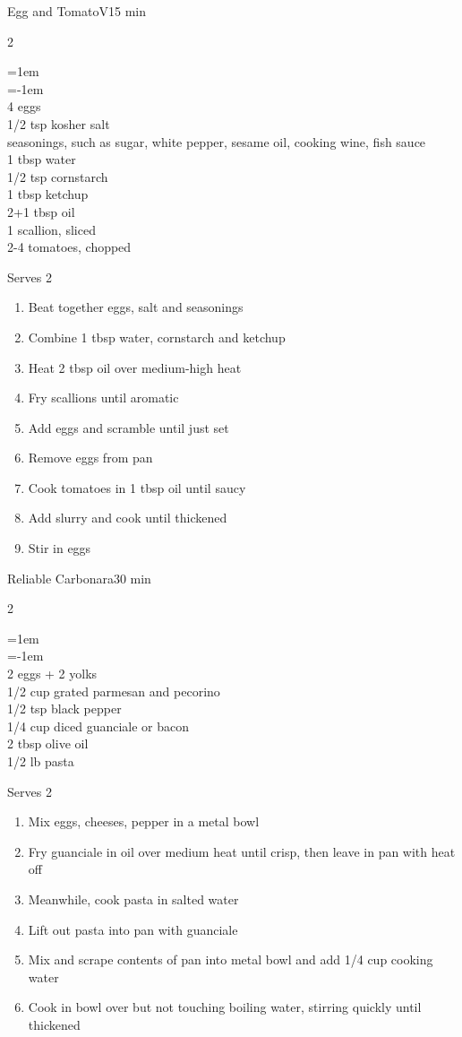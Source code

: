 \documentclass{article}
\newenvironment{recipe}[3][]
    {\begin{cardbase}[#1]{#2}{#3}
    \columnratio{0.333}
    \begin{paracol}{2}}
    {\end{paracol}\end{cardbase}}
\newenvironment{denserecipe}[3][]
    {\small
    \begin{recipe}[#1]{#2}{#3}}
    {\end{recipe}}
\newcommand{\nextcolumn}{\switchcolumn}
\newenvironment{ingredients}
    {
    \begin{obeylines}
    \vspace{\parskip}
    \setlength{\parskip}{0.25em}
    \vspace{-0.25em}
    \leftskip=1em
    \parindent=-1em}
    {\end{obeylines}}
\newenvironment{steps}
    {\begin{enumerate}[leftmargin=*,topsep=0pt]}
    {\end{enumerate}}
\newcommand{\tag}[1]{\hspace{1em}#1}
\newcommand{\symboltag}[2]{\tag{#1\hspace{0.4em}#2}}
\newcommand{\totaltime}[1]{\symboltag{\raisebox{-0.1em}{\small\StopWatchEnd}}{#1}}
\begin{document}
\begin{denserecipe}{Egg and Tomato}{\tag{V}\totaltime{15 min}}
\begin{ingredients}
4 eggs
1/2 tsp kosher salt
seasonings, such as sugar, white pepper, sesame oil, cooking wine, fish sauce
1 tbsp water
1/2 tsp cornstarch
1 tbsp ketchup
2+1 tbsp oil
1 scallion, sliced
2-4 tomatoes, chopped
\end{ingredients}
\nextcolumn
Serves 2
\begin{steps}
    \item Beat together eggs, salt and seasonings
    \item Combine 1 tbsp water, cornstarch and ketchup
    \item Heat 2 tbsp oil over medium-high heat
    \item Fry scallions until aromatic
    \item Add eggs and scramble until just set
    \item Remove eggs from pan
    \item Cook tomatoes in 1 tbsp oil until saucy
    \item Add slurry and cook until thickened
    \item Stir in eggs
\end{steps}
\end{denserecipe}

\begin{recipe}{Reliable Carbonara}{\totaltime{30 min}}
\begin{ingredients}
2 eggs + 2 yolks
1/2 cup grated parmesan and pecorino
1/2 tsp black pepper
1/4 cup diced guanciale or bacon
2 tbsp olive oil
1/2 lb pasta
\end{ingredients}
\nextcolumn
Serves 2
\begin{steps}
    \item Mix eggs, cheeses, pepper in a metal bowl
    \item Fry guanciale in oil over medium heat until crisp, then leave in pan with heat off
    \item Meanwhile, cook pasta in salted water
    \item Lift out pasta into pan with guanciale
    \item Mix and scrape contents of pan into metal bowl and add 1/4 cup cooking water
    \item Cook in bowl over but not touching boiling water, stirring quickly until thickened
\end{steps}
\end{recipe}
\end{document}
